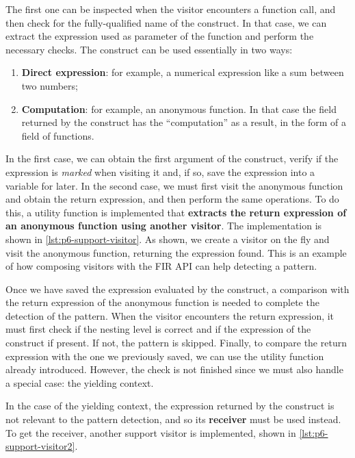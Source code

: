 \documentclass[12pt,a4paper,openright,twoside]{book}
\begin{document}
The first one can be inspected when the visitor encounters a function call, and
then check for the fully-qualified name of the construct. In that case, we can
extract the expression used as parameter of the function and perform the
necessary checks. The  construct can be used essentially in
two ways:
\begin{enumerate}
  \item \textbf{Direct expression}: for example, a numerical expression like a
  sum between two numbers;
  \item \textbf{Computation}: for example, an anonymous function. In that case
  the field returned by the construct has the ``computation'' as a result, in
  the form of a field of functions.
\end{enumerate}

In the first case, we can obtain the first argument of the construct, verify if
the expression is \emph{marked} when visiting it and, if so, save the expression
into a variable for later. In the second case, we must first visit the anonymous
function and obtain the return expression, and then perform the same operations.
To do this, a utility function is implemented that \textbf{extracts the return
expression of an anonymous function using another visitor}. The implementation
is shown in \cref{lst:p6-support-visitor}. As shown, we create a visitor on the
fly and visit the anonymous function, returning the expression found. This is an
example of how composing visitors with the \ac{FIR} API can help detecting a
pattern.



Once we have saved the expression evaluated by the  construct,
a comparison with the return expression of the anonymous function is needed to
complete the detection of the pattern. When the visitor encounters the return
expression, it must first check if the nesting level is correct and if the
expression of the  construct if present. If not, the pattern
is skipped. Finally, to compare the return expression with the one we previously
saved, we can use the  utility function already
introduced. However, the check is not finished since we must also handle a
special case: the yielding context. 

In the case of the yielding context, the expression returned by the
 construct is not relevant to the pattern detection, and so
its \textbf{receiver} must be used instead. To get the receiver, another support 
visitor is implemented, shown in \cref{lst:p6-support-visitor2}.
\end{document}
